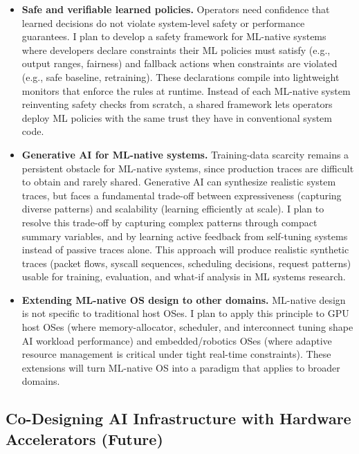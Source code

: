 \documentclass[11pt,letterpaper]{article}
\newcommand{\keyterm}[1]{\textbf{\color{darkgray}#1}}
\begin{document}
\begin{itemize}[leftmargin=*,itemsep=5pt]
  \item \keyterm{Safe and verifiable learned policies.}
  Operators need confidence that learned decisions do not violate system-level safety or performance guarantees.
  I plan to develop a safety framework for ML-native systems where developers declare constraints their ML policies must satisfy (e.g., output ranges, fairness) and fallback actions when constraints are violated (e.g., safe baseline, retraining). These declarations compile into lightweight monitors that enforce the rules at runtime.
  Instead of each ML-native system reinventing safety checks from scratch, a shared framework lets operators deploy ML policies with the same trust they have in conventional system code.

  \item \keyterm{Generative AI for ML-native systems.} Training-data scarcity remains a persistent obstacle for ML-native systems, since production traces are difficult to obtain and rarely shared.
  Generative AI can synthesize realistic system traces, but faces a fundamental trade-off between expressiveness (capturing diverse patterns) and scalability (learning efficiently at scale).
  I plan to resolve this trade-off by capturing complex patterns through compact summary variables, and by learning active feedback from self-tuning systems instead of passive traces alone.
  This approach will produce realistic synthetic traces (packet flows, syscall sequences, scheduling decisions, request patterns) usable for training, evaluation, and what-if analysis in ML systems research.

  \item \keyterm{Extending ML-native OS design to other domains.}
  ML-native design is not specific to traditional host OSes.
  I plan to apply this principle to GPU host OSes (where memory-allocator, scheduler, and interconnect tuning shape AI workload performance) and embedded/robotics OSes (where adaptive resource management is critical under tight real-time constraints).
  These extensions will turn ML-native OS into a paradigm that applies to broader domains.
\end{itemize}

\subsection{Co-Designing AI Infrastructure with Hardware Accelerators (Future)}
\end{document}
